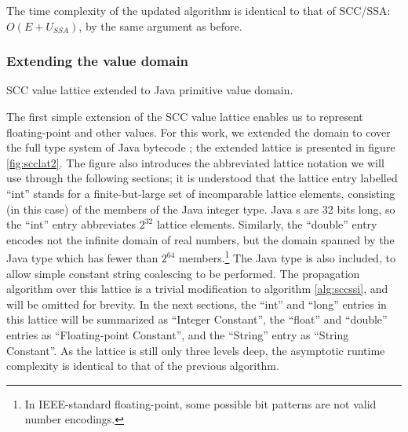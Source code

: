 \documentclass[12pt,titlepage,twoside]{article}
\newcommand*{\figscale}{1.0}
\begin{document}
The time complexity of the updated algorithm is identical to that of
SCC/SSA: $O(E+U_{SSA})$, by the same argument as before.

\subsubsection{Extending the value domain}
\begin{myfigure}
\centering\renewcommand*{\figscale}{0.5}
\caption{SCC value lattice extended to Java primitive value domain.}
\label{fig:scclat2}
\end{myfigure}
The first simple extension of the SCC value lattice enables us to
represent floating-point and other values.  For this work, we extended
the domain to cover the full type system of Java bytecode
\cite{gosling95:bytecode}; the extended lattice is presented in figure
\ref{fig:scclat2}.
The figure also introduces the abbreviated lattice notation we will use
through the following sections; it is understood that the
lattice entry labelled ``int'' stands for a finite-but-large set of
incomparable lattice elements, consisting (in this case) of the
members of the Java  integer type.
Java s are 32 bits long, so the ``int'' entry abbreviates
$2^{32}$ lattice elements.  Similarly, the ``double'' entry encodes not
the infinite domain of real numbers, but the domain spanned by the
Java  type which has fewer than $2^{64}$
members.\footnote{In IEEE-standard floating-point, some possible bit
patterns are not valid number encodings.}  The
Java  type is also included, to allow simple constant
string coalescing to be performed.  The propagation algorithm over
this lattice is a trivial modification to algorithm \ref{alg:sccssi}, and
will be omitted for brevity.  In the next sections, the ``int'' and ``long''
entries in this lattice will be summarized as ``Integer Constant'',
the ``float'' and ``double'' entries as ``Floating-point Constant'',
and the ``String'' entry as ``String Constant''.  As the lattice is
still only three levels deep, the asymptotic runtime complexity is
identical to that of the previous algorithm.
\end{document}
